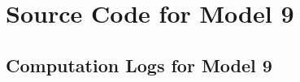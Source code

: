 \newpage
\section{Source Code for Model 9}


\newpage
\begin{landscape}
    \section{Computation Logs for Model 9}
    
\end{landscape}

% 

%     




